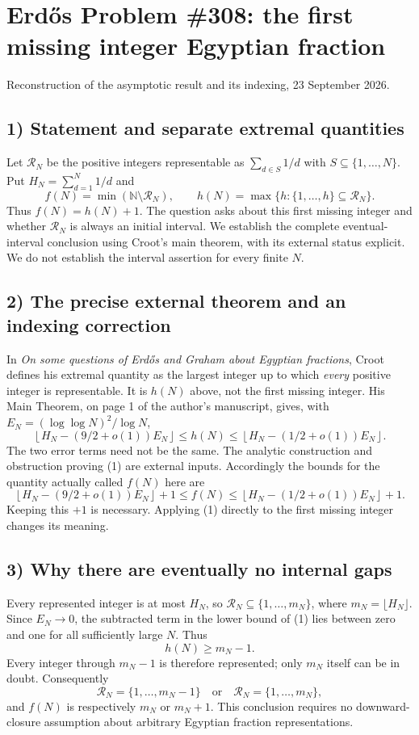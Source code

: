 \section{Erd\H{o}s Problem \#308: the first missing integer Egyptian fraction}
\noindent Reconstruction of the asymptotic result and its indexing, 23 September 2026.

\subsection*{1) Statement and separate extremal quantities}
Let $\mathcal R_N$ be the positive integers representable as $\sum_{d\in S}1/d$ with $S\subseteq\{1,\ldots,N\}$. Put $H_N=\sum_{d=1}^N1/d$ and
\[
 f(N)=\min(\mathbb N\setminus\mathcal R_N),\qquad
 h(N)=\max\{h:\{1,\ldots,h\}\subseteq\mathcal R_N\}.
\]
Thus $f(N)=h(N)+1$. The question asks about this first missing integer and whether $\mathcal R_N$ is always an initial interval. We establish the complete eventual-interval conclusion using Croot's main theorem, with its external status explicit. We do not establish the interval assertion for every finite $N$.

\subsection*{2) The precise external theorem and an indexing correction}
In \emph{On some questions of Erd\H{o}s and Graham about Egyptian fractions}, Croot defines his extremal quantity as the largest integer up to which \emph{every} positive integer is representable. It is $h(N)$ above, not the first missing integer. His Main Theorem, on page 1 of the author's manuscript, gives, with $E_N=(\log\log N)^2/\log N$,
\[
 \left\lfloor H_N-(9/2+o(1))E_N\right\rfloor
 \le h(N)\le
 \left\lfloor H_N-(1/2+o(1))E_N\right\rfloor.\tag{1}
\]
The two error terms need not be the same. The analytic construction and obstruction proving (1) are external inputs. Accordingly the bounds for the quantity actually called $f(N)$ here are
\[
 \left\lfloor H_N-(9/2+o(1))E_N\right\rfloor+1
 \le f(N)\le
 \left\lfloor H_N-(1/2+o(1))E_N\right\rfloor+1.\tag{2}
\]
Keeping this $+1$ is necessary. Applying (1) directly to the first missing integer changes its meaning.

\subsection*{3) Why there are eventually no internal gaps}
Every represented integer is at most $H_N$, so $\mathcal R_N\subseteq\{1,\ldots,m_N\}$, where $m_N=\lfloor H_N\rfloor$. Since $E_N\to0$, the subtracted term in the lower bound of (1) lies between zero and one for all sufficiently large $N$. Thus
\[
 h(N)\ge m_N-1.
\]
Every integer through $m_N-1$ is therefore represented; only $m_N$ itself can be in doubt. Consequently
\[
 \mathcal R_N=\{1,\ldots,m_N-1\}
 \quad\text{or}\quad
 \mathcal R_N=\{1,\ldots,m_N\},\tag{3}
\]
and $f(N)$ is respectively $m_N$ or $m_N+1$. This conclusion requires no downward-closure assumption about arbitrary Egyptian fraction representations.

